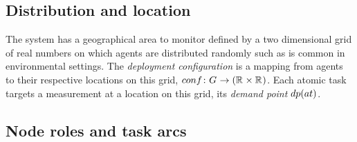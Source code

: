 \subsection{Distribution and location}
The system has a geographical area to monitor defined by a two dimensional grid of real numbers on which agents are distributed randomly such as is common in environmental settings. The \textit{deployment configuration} is a mapping from agents to their respective locations on this grid, $\formalDeployment{}{}$. Each atomic task targets a measurement at a location on this grid, its \textit{demand point} $\functionTaskDemandPoint{}{}$.

\subsection{Node roles and task arcs}
\newcommand{\formalSinkRole}[2]{
	\functionFormal{sink}
	{\setAtomicTask{}{}}
	{\setAgents{}{}}
}
\newcommand{\formalSenseRole}[2]{
	\functionFormal{sensor}
	{\setAtomicTask{}{}}
	{\setAgents{}{}}
}
\newcommand{\formalActiveRole}[2]{
	\functionFormal{active}
	{\setAtomicTask{}{}}
	{\powerSetAgents{}{}}
}
\newcommand{\formalIdleRole}[2]{
	\functionFormal{idle_{\setTime{}{}}}
	{\setAtomicTask{}{}}
	{\powerSetAgents{}{}}
}
\newcommand{\formalSleepRole}[2]{
	\functionFormal{sink_{\setTime{}{}}}
	{\setAtomicTask{}{}}
	{\powerSetAgents{}{}}
}
\newcommand{\functionSinkRole}[2]{\functionSignature{sink}{\varAtomicTask{}{}}}
	
\newcommand{\functionSenseRole}[2]{\functionSignature{sensor}{\varAtomicTask{}{}}}
\newcommand{\functionActiveRole}[2]{\functionSignature{active_{#1}}{\varAtomicTask{}{}}}
\newcommand{\functionIdleRole}[2]{\functionSignature{idle}{\varAtomicTask{}{}}}
\newcommand{\functionSleepRole}[2]{\functionSignature{sleep}{\varAtomicTask{}{}}}

